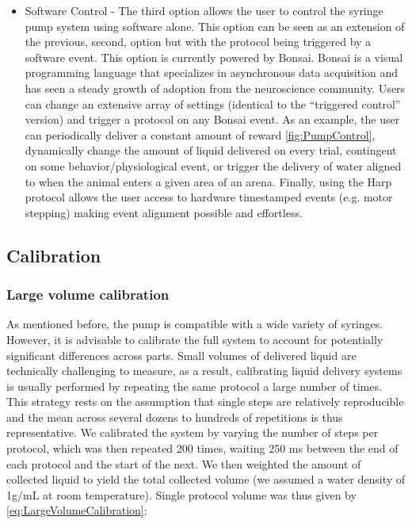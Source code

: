 \begin{itemize}
\item{Software Control} - The third option allows the user to control the syringe pump system using software alone. This option can be seen as an extension of the previous, second, option but with the protocol being triggered by a software event. This option is currently powered by Bonsai. Bonsai is a visual programming language that specializes in asynchronous data acquisition and has seen a steady growth of adoption from the neuroscience community. Users can change an extensive array of settings (identical to the “triggered control” version) and trigger a protocol on any Bonsai event. As an example, the user can periodically deliver a constant amount of reward \ref{fig:PumpControl}, dynamically change the amount of liquid delivered on every trial, contingent on some behavior/physiological event, or trigger the delivery of water aligned to when the animal enters a given area of an arena.
Finally, using the Harp protocol allows the user access to hardware timestamped events (e.g. motor stepping) making event alignment possible and effortless.

\end{itemize}

\subsection*{Calibration}
\subsubsection*{Large volume calibration}
As mentioned before, the pump is compatible with a wide variety of syringes. However, it is advisable to calibrate the full system to account for potentially significant differences across parts. Small volumes of delivered liquid are technically challenging to measure, as a result, calibrating liquid delivery systems is usually performed by repeating the same protocol a large number of times. This strategy rests on the assumption that single steps are relatively reproducible and the mean across several dozens to hundreds of repetitions is thus representative. We calibrated the system by varying the number of steps per protocol, which was then repeated 200 times, waiting 250 ms between the end of each protocol and the start of the next. We then weighted the amount of collected liquid to yield the total collected volume (we assumed a water density of 1g/mL at room temperature). Single protocol volume was thus given by \ref{eq:LargeVolumeCalibration}:

